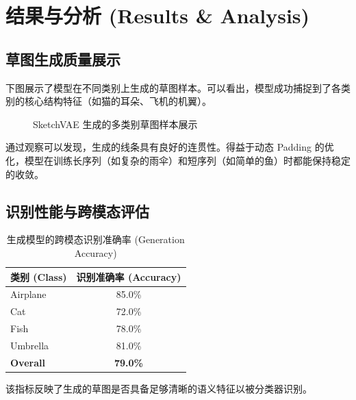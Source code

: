 \documentclass{sjtuarticle}
\begin{document}
\section{结果与分析 (Results \& Analysis)}

\subsection{草图生成质量展示}
下图展示了模型在不同类别上生成的草图样本。可以看出，模型成功捕捉到了各类别的核心结构特征（如猫的耳朵、飞机的机翼）。

\begin{figure}[H]
    \centering
    \caption{SketchVAE 生成的多类别草图样本展示}
    \label{fig:gen_samples}
\end{figure}

通过观察可以发现，生成的线条具有良好的连贯性。得益于动态 Padding 的优化，模型在训练长序列（如复杂的雨伞）和短序列（如简单的鱼）时都能保持稳定的收敛。

\subsection{识别性能与跨模态评估}
\begin{table}[htbp]
  \centering
  \begin{threeparttable}
  \caption{生成模型的跨模态识别准确率 (Generation Accuracy)}
  \label{tab:gen_acc}
  \begin{tabular}{lc}
    \toprule
    类别 (Class) & 识别准确率 (Accuracy) \\
    \midrule
    Airplane & 85.0\% \\
    Cat      & 72.0\% \\
    Fish     & 78.0\% \\
    Umbrella & 81.0\% \\
    \midrule
    \textbf{Overall} & \textbf{79.0\%} \\
    \bottomrule
  \end{tabular}
  \begin{tablenotes}
    \item[1] 该指标反映了生成的草图是否具备足够清晰的语义特征以被分类器识别。
  \end{tablenotes}
  \end{threeparttable}
\end{table}
\end{document}

